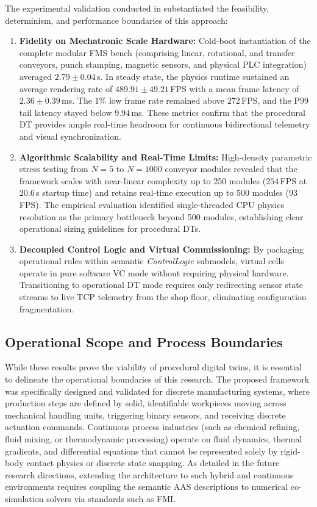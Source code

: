 The experimental validation conducted in  substantiated the feasibility, determinism, and performance boundaries of this approach:
\begin{enumerate}
    \item \textbf{Fidelity on Mechatronic Scale Hardware:} Cold-boot instantiation of the complete modular \gls{FMS} bench (comprising linear, rotational, and transfer conveyors, punch stamping, magnetic sensors, and physical \gls{PLC} integration) averaged $2.79 \pm 0.04\,$s. In steady state, the physics runtime sustained an average rendering rate of $489.91 \pm 49.21\,$\gls{FPS} with a mean frame latency of $2.36 \pm 0.39\,$ms. The 1\% low frame rate remained above $272\,$\gls{FPS}, and the P99 tail latency stayed below $9.94\,$ms. These metrics confirm that the procedural \gls{DT} provides ample real-time headroom for continuous bidirectional telemetry and visual synchronization.
    \item \textbf{Algorithmic Scalability and Real-Time Limits:} High-density parametric stress testing from $N=5$ to $N=1000$ conveyor modules revealed that the framework scales with near-linear complexity up to 250 modules ($254\,$\gls{FPS} at $20.6\,$s startup time) and retains real-time execution up to 500 modules ($93\,$\gls{FPS}). The empirical evaluation identified single-threaded \gls{CPU} physics resolution as the primary bottleneck beyond 500 modules, establishing clear operational sizing guidelines for procedural \glspl{DT}.
    \item \textbf{Decoupled Control Logic and Virtual Commissioning:} By packaging operational rules within semantic \textit{ControlLogic} submodels, virtual cells operate in pure software \gls{VC} mode without requiring physical hardware. Transitioning to operational \gls{DT} mode requires only redirecting sensor state streams to live \gls{TCP} telemetry from the shop floor, eliminating configuration fragmentation.
\end{enumerate}

\subsection{Operational Scope and Process Boundaries}

While these results prove the viability of procedural digital twins, it is essential to delineate the operational boundaries of this research. The proposed framework was specifically designed and validated for discrete manufacturing systems, where production steps are defined by solid, identifiable workpieces moving across mechanical handling units, triggering binary sensors, and receiving discrete actuation commands. Continuous process industries (such as chemical refining, fluid mixing, or thermodynamic processing) operate on fluid dynamics, thermal gradients, and differential equations that cannot be represented solely by rigid-body contact physics or discrete state snapping. As detailed in the future research directions, extending the architecture to such hybrid and continuous environments requires coupling the semantic \gls{AAS} descriptions to numerical co-simulation solvers via standards such as \gls{FMI}.

